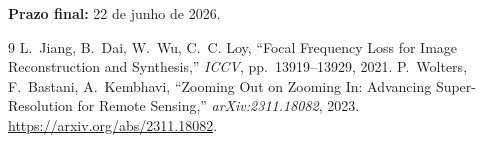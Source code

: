 \documentclass[12pt, a4paper]{article}
\begin{document}
\vspace{0.5em}
\textbf{Prazo final:} 22 de junho de 2026.

\begin{thebibliography}{9}
    L.~Jiang, B.~Dai, W.~Wu, C.~C. Loy,
    ``Focal Frequency Loss for Image Reconstruction and Synthesis,''
    \textit{ICCV}, pp.~13919--13929, 2021.
    P.~Wolters, F.~Bastani, A.~Kembhavi,
    ``Zooming Out on Zooming In: Advancing Super-Resolution for Remote Sensing,''
    \textit{arXiv:2311.18082}, 2023.
    \url{https://arxiv.org/abs/2311.18082}.
\end{thebibliography}
\end{document}
